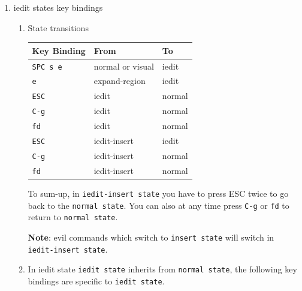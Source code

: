 \documentclass[11pt]{article}
\begin{document}
\begin{enumerate}
\item iedit states key bindings
\label{sec:org14a9998}
\begin{enumerate}
\item State transitions
\label{sec:org48c5502}

\begin{center}
\begin{tabular}{lll}
Key Binding & From & To\\
\hline
\texttt{SPC s e} & normal or visual & iedit\\
\texttt{e} & expand-region & iedit\\
\texttt{ESC} & iedit & normal\\
\texttt{C-g} & iedit & normal\\
\texttt{fd} & iedit & normal\\
\texttt{ESC} & iedit-insert & iedit\\
\texttt{C-g} & iedit-insert & normal\\
\texttt{fd} & iedit-insert & normal\\
\end{tabular}
\end{center}

To sum-up, in \texttt{iedit-insert state} you have to press ESC twice to go back to the
\texttt{normal state}. You can also at any time press \texttt{C-g} or \texttt{fd} to return to \texttt{normal
state}.

\textbf{Note}: evil commands which switch to \texttt{insert state} will switch in
\texttt{iedit-insert state}.

\item In iedit state
\label{sec:org8d2f11d}
\texttt{iedit state} inherits from \texttt{normal state}, the following key bindings are
specific to \texttt{iedit state}.


\end{enumerate}
\end{enumerate}
\end{document}
